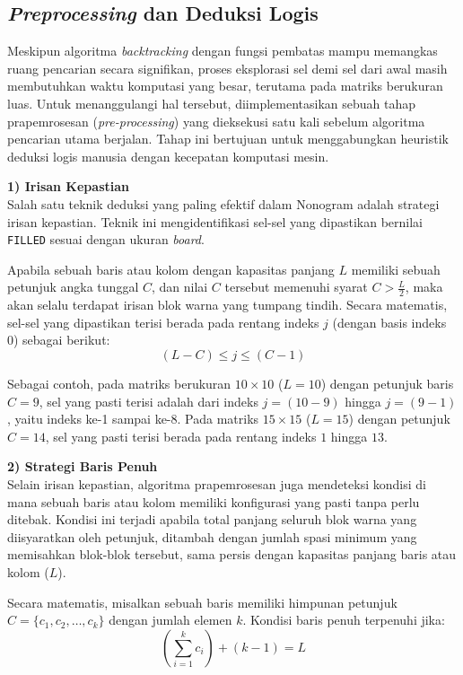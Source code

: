 \documentclass[conference]{IEEEtran}
\begin{document}
\subsection{\textit{Preprocessing} dan Deduksi Logis}
Meskipun algoritma \textit{backtracking} dengan fungsi pembatas mampu memangkas ruang pencarian secara signifikan, proses eksplorasi sel demi sel dari awal masih membutuhkan waktu komputasi yang besar, terutama pada matriks berukuran luas. Untuk menanggulangi hal tersebut, diimplementasikan sebuah tahap prapemrosesan (\textit{pre-processing}) yang dieksekusi satu kali sebelum algoritma pencarian utama berjalan. Tahap ini bertujuan untuk menggabungkan heuristik deduksi logis manusia dengan kecepatan komputasi mesin.

\textbf{1) Irisan Kepastian} \\
Salah satu teknik deduksi yang paling efektif dalam Nonogram adalah strategi irisan kepastian. Teknik ini mengidentifikasi sel-sel yang dipastikan bernilai \texttt{FILLED} sesuai dengan ukuran \textit{board}.

Apabila sebuah baris atau kolom dengan kapasitas panjang $L$ memiliki sebuah petunjuk angka tunggal $C$, dan nilai $C$ tersebut memenuhi syarat $C \gt \frac{L}{2}$, maka akan selalu terdapat irisan blok warna yang tumpang tindih. Secara matematis, sel-sel yang dipastikan terisi berada pada rentang indeks $j$ (dengan basis indeks 0) sebagai berikut:
\begin{equation*}
    (L - C) \le j \le (C - 1)
\end{equation*}

Sebagai contoh, pada matriks berukuran $10 \times 10$ ($L = 10$) dengan petunjuk baris $C = 9$, sel yang pasti terisi adalah dari indeks $j = (10 - 9)$ hingga $j = (9 - 1)$, yaitu indeks ke-1 sampai ke-8. Pada matriks $15 \times 15$ ($L = 15$) dengan petunjuk $C = 14$, sel yang pasti terisi berada pada rentang indeks $1$ hingga $13$.

\textbf{2) Strategi Baris Penuh} \\
Selain irisan kepastian, algoritma prapemrosesan juga mendeteksi kondisi di mana sebuah baris atau kolom memiliki konfigurasi yang pasti tanpa perlu ditebak. Kondisi ini terjadi apabila total panjang seluruh blok warna yang diisyaratkan oleh petunjuk, ditambah dengan jumlah spasi minimum yang memisahkan blok-blok tersebut, sama persis dengan kapasitas panjang baris atau kolom ($L$).

Secara matematis, misalkan sebuah baris memiliki himpunan petunjuk $C = \{c_1, c_2, \dots, c_k\}$ dengan jumlah elemen $k$. Kondisi baris penuh terpenuhi jika:
\begin{equation*}
    \left( \sum_{i=1}^{k} c_i \right) + (k - 1) = L
\end{equation*}
\end{document}
